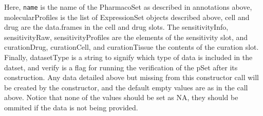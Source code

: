 \documentclass[11pt]{article}
\begin{document}
Here, \texttt{name} is the name of the PharmacoSet as described in annotations above, molecularProfiles is the list of ExpressionSet objects described above, cell and drug are the data.frames in the cell and drug slots. The sensitivityInfo, sensitivityRaw, sensitivityProfiles are the elements of the sensitivity slot, and curationDrug, curationCell, and curationTissue the contents of the curation slot. Finally, datasetType is a string to signify which type of data is included in the datset, and verify is a flag for running the verification of the pSet after its construction. Any data detailed above but missing from this constructor call will be created by the constructor, and the default empty values are as in the call above. Notice that none of the values should be set as NA, they should be ommited if the data is not being provided. 
\end{document}
